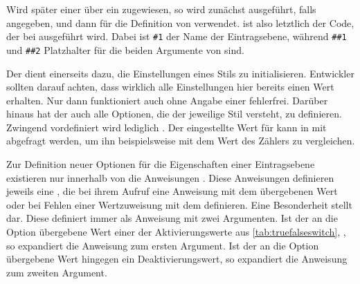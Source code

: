 Wird später einer  über
 ein  zugewiesen, so
wird zunächst  ausgeführt, falls angegeben, und
dann  für die Definition von
 verwendet.  ist also
letztlich der Code, der bei  ausgeführt
wird. Dabei ist \texttt{\#1} der Name der Eintragsebene, während
\texttt{\#\#1} und \texttt{\#\#2} Platzhalter für die beiden Argumente von
 sind.

Der  dient einerseits dazu, die Einstellungen
eines Stils zu initialisieren. Entwickler sollten darauf
achten, dass wirklich alle Einstellungen hier bereits einen Wert erhalten. Nur
dann funktioniert  auch ohne
Angabe einer  fehlerfrei. Darüber hinaus hat der
 auch alle Optionen, die der jeweilige Stil
versteht, zu definieren. Zwingend vordefiniert wird lediglich
. Der eingestellte Wert für  kann in
 mit %
 abgefragt werden, um ihn
beispielsweise mit dem Wert des Zählers
 zu vergleichen.

Zur Definition neuer Optionen für die Eigenschaften einer
Eintragsebene existieren nur innerhalb von  die
Anweisungen .
Diese Anweisungen definieren jeweils eine , die bei ihrem
Aufruf eine Anweisung
 mit dem übergebenen
Wert oder bei Fehlen einer Wertzuweisung mit dem 
definieren. Eine Besonderheit stellt  dar. Diese
definiert  immer als
Anweisung mit zwei Argumenten. Ist der an die Option übergebene Wert einer der
Aktivierungswerte aus \autoref{tab:truefalseswitch},
, so expandiert die Anweisung zum ersten
Argument. Ist der an die Option übergebene Wert hingegen ein
Deaktivierungswert, so expandiert die Anweisung zum zweiten Argument.

